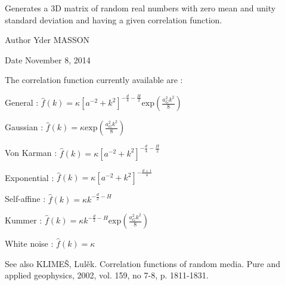 \-Generates a 3\-D matrix of random real numbers with zero mean and unity standard deviation and having a given correlation function. 

\begin{DoxyAuthor}{\-Author}
\-Yder \-M\-A\-S\-S\-O\-N 
\end{DoxyAuthor}
\begin{DoxyDate}{\-Date}
\-November 8, 2014
\end{DoxyDate}
\-The correlation function currently available are \-: \par
 \par
 \par
 \-General \-: $ \hat{f}(k) = \kappa \left[ a^{-2}+k^2\right]^{-\frac{d}{4}-\frac{H}{2}} \mbox{exp}\left(\frac{a_G^2k^2}{8}\right)$ \par
 \par
 \-Gaussian \-: $ \hat{f}(k) = \kappa \mbox{exp}\left(\frac{a_G^2k^2}{8}\right)$ \par
 \par
 \-Von \-Karman \-: $ \hat{f}(k) = \kappa \left[ a^{-2}+k^2\right]^{-\frac{d}{4}-\frac{H}{2}}$ \par
 \par
 \-Exponential \-: $ \hat{f}(k) = \kappa \left[ a^{-2}+k^2\right]^{-\frac{d+1}{4}}$ \par
 \par
 \-Self-\/affine \-: $ \hat{f}(k) = \kappa k^{-\frac{d}{2}-H}$ \par
 \par
 \-Kummer \-: $ \hat{f}(k) = \kappa k^{-\frac{d}{2}-H} \mbox{exp}\left(\frac{a_G^2k^2}{8}\right)$ \par
 \par
 \-White noise \-: $ \hat{f}(k) = \kappa $

\begin{DoxySeeAlso}{\-See also}
\-K\-L\-I\-M\-EŠ, \-Lulěk. \-Correlation functions of random media. \-Pure and applied geophysics, 2002, vol. 159, no 7-\/8, p. 1811-\/1831. 
\end{DoxySeeAlso}

